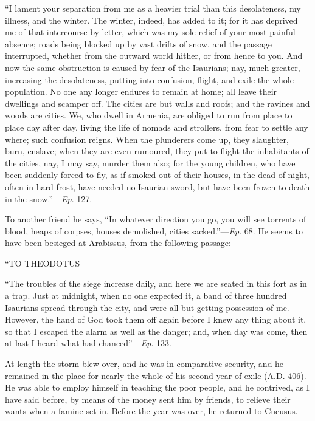 ``I lament your separation from me as a heavier trial than this
desolateness, my illness, and the winter. The winter, indeed, has
added to it; for it has deprived me of that intercourse by letter,
which was my sole relief of your most painful absence; roads being
blocked up by vast drifts of snow, and the passage interrupted,
whether from the outward world hither, or from
hence to you. And now the same obstruction is caused by fear of the
Isaurians; nay, much greater, increasing the desolateness, putting
into confusion, flight, and exile the whole population. No one any
longer endures to remain at home; all leave their dwellings and
scamper off. The cities are but walls and roofs; and the ravines and
woods are cities. We, who dwell in Armenia, are obliged to run from
place to place day after day, living the life of nomads and strollers,
from fear to settle any where; such confusion reigns. When the
plunderers come up, they slaughter, burn, enslave; when they are even
rumoured, they put to flight the inhabitants of the cities, nay, I may
say, murder them also; for the young children, who have been suddenly
forced to fly, as if smoked out of their houses, in the dead of night,
often in hard frost, have needed no Isaurian sword, but have been
frozen to death in the snow.''—\emph{Ep}. 127.

To another friend he says, ``In whatever direction you go, you
will see torrents of blood, heaps of corpses, houses demolished,
cities sacked.''—\emph{Ep}. 68. He seems to have been besieged
at Arabissus, from the following passage:

``TO
THEODOTUS

``The troubles of the siege increase daily, and here we are
seated in this fort as in a trap. Just at midnight, when no one
expected it, a band of three hundred Isaurians spread through the
city, and were all but getting possession of me. However, the hand of
God took them off again before I knew any thing about it, so that I
escaped the alarm as well as the danger; and, when day was come, then
at last I heard what had chanced''—\emph{Ep}. 133.

At length the storm blew over, and he was in comparative security,
and he remained in the place for nearly the whole of his second year
of exile (A.D. 406). He was able to employ
himself in teaching the poor people, and he contrived, as I have said
before, by means of the money sent him by friends, to relieve their
wants when a famine set in. Before the year was over, he
returned to Cucusus.

